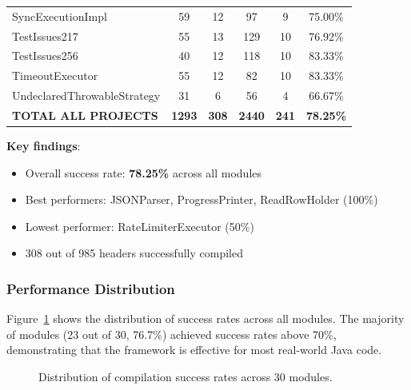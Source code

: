\begin{table}[h]
\begin{tabular}{lccccc}
SyncExecutionImpl & 59 & 12 & 97 & 9 & 75.00\% \\
TestIssues217 & 55 & 13 & 129 & 10 & 76.92\% \\
TestIssues256 & 40 & 12 & 118 & 10 & 83.33\% \\
TimeoutExecutor & 55 & 12 & 82 & 10 & 83.33\% \\
UndeclaredThrowableStrategy & 31 & 6 & 56 & 4 & 66.67\% \\
\midrule
\textbf{TOTAL ALL PROJECTS} & \textbf{1293} & \textbf{308} & \textbf{2440} & \textbf{241} & \textbf{78.25\%} \\
\bottomrule
\end{tabular}
\end{table}

\textbf{Key findings}:
\begin{itemize}
\item Overall success rate: \textbf{78.25\%} across all modules
\item Best performers: JSONParser, ProgressPrinter, ReadRowHolder (100\%)
\item Lowest performer: RateLimiterExecutor (50\%)
\item 308 out of 985 headers successfully compiled
\end{itemize}

\subsubsection{Performance Distribution}

Figure~\ref{fig:performance-distribution} shows the distribution of success rates across all modules. The majority of modules (23 out of 30, 76.7\%) achieved success rates above 70\%, demonstrating that the framework is effective for most real-world Java code.

\begin{figure}[h]
\centering
{}
\caption{Distribution of compilation success rates across 30 modules.}
\label{fig:performance-distribution}
\end{figure}

